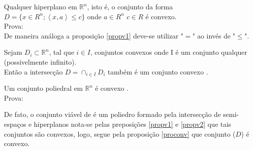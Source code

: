 	\begin{prop}%
		\label{propv2}
		Qualquer hiperplano em $\mathbb{R}^n$, isto \'e, o conjunto da forma $D = \{x \in R^n;\left <x,a \right >  \leq
	 	c\}$ onde $a \in R^n$ $c \in R$ \'e convexo. \\
	 	Prova:\\
	 	De maneira an\'aloga a proposi\c c\~ao \autoref{propv1} deve-se utilizar "$=$" ao inv\'es de "$\leq$".
	\end{prop}
	\begin{prop}%
		\label{proconv}
 		Sejam $D_i \subset \mathbb R^n$, tal que $i \in I$, conjuntos convexos onde I \'e um conjunto qualquer (possivelmente infinito). \\
  		Ent\~ao a intersec\c c\~ao $D = \cap _{i \in I} D_i$ tamb\'em \'e um conjunto convexo \cite{alexey}.
 	\end{prop}
	\begin{cor}%
		\label{cov1}
		Um conjunto poliedral em $\mathbb{R}^n$ \'e convexo \cite{alexey}.\\
		Prova:

		De fato, o conjunto vi\'avel de  \'e um poliedro formado pela intersec\c c\~ao de semi-espa\c cos e
		hiperplanos nota-se pelas preposi\c c\~oes \autoref{propv1} e \autoref{propv2} que tais conjuntos s\~ao convexos, logo,
		segue pela proposi\c c\~ao \autoref{proconv} que conjunto ($D$) \'e convexo.
	\end{cor}
 \noindent

